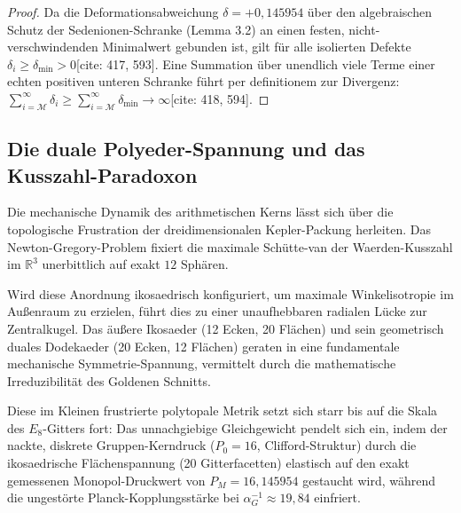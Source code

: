 \documentclass[11pt,a4paper]{article}
\newcommand{\R}{\mathbb{R}}
\newcommand{\Eoct}{E_8}
\theoremstyle{definition}
\begin{document}
	\begin{proof}
		Da die Deformationsabweichung $\delta = +0{,}145954$ über den algebraischen Schutz der Sedenionen-Schranke (Lemma 3.2) an einen festen, nicht-verschwindenden Minimalwert gebunden ist, gilt für alle isolierten Defekte $\delta_i \ge \delta_{\min} > 0$[cite: 417, 593]. Eine Summation über unendlich viele Terme einer echten positiven unteren Schranke führt per definitionem zur Divergenz: $\sum_{i=\mathcal{M}}^{\infty} \delta_i \ge \sum_{i=\mathcal{M}}^{\infty} \delta_{\min} \rightarrow \infty$[cite: 418, 594].
	\end{proof}
	
	\subsection{Die duale Polyeder-Spannung und das Kusszahl-Paradoxon}
	Die mechanische Dynamik des arithmetischen Kerns lässt sich über die topologische Frustration der dreidimensionalen Kepler-Packung herleiten. Das Newton-Gregory-Problem fixiert die maximale Schütte-van der Waerden-Kusszahl im $\R^3$ unerbittlich auf exakt $12$ Sphären. 
	
	Wird diese Anordnung ikosaedrisch konfiguriert, um maximale Winkelisotropie im Außenraum zu erzielen, führt dies zu einer unaufhebbaren radialen Lücke zur Zentralkugel. Das äußere Ikosaeder (12 Ecken, 20 Flächen) und sein geometrisch duales Dodekaeder (20 Ecken, 12 Flächen) geraten in eine fundamentale mechanische Symmetrie-Spannung, vermittelt durch die mathematische Irreduzibilität des Goldenen Schnitts. 
	
	Diese im Kleinen frustrierte polytopale Metrik setzt sich starr bis auf die Skala des $\Eoct$-Gitters fort: Das unnachgiebige Gleichgewicht pendelt sich ein, indem der nackte, diskrete Gruppen-Kerndruck ($P_0 = 16$, Clifford-Struktur) durch die ikosaedrische Flächenspannung (20 Gitterfacetten) elastisch auf den exakt gemessenen Monopol-Druckwert von $P_M = 16{,}145954$ gestaucht wird, während die ungestörte Planck-Kopplungsstärke bei $\alpha_G^{-1} \approx 19{,}84$ einfriert.
	
\end{document}
